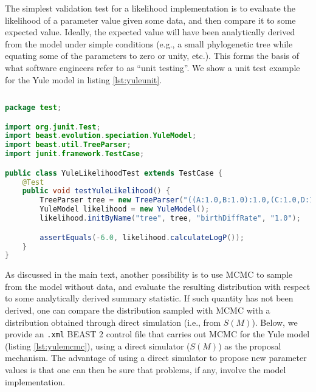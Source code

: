 \documentclass[oneside]{article}
\begin{document}
The simplest validation test for a likelihood implementation is to
evaluate the likelihood of a parameter value given some
data, and then compare it to some expected value.
Ideally, the expected value will have been analytically derived from the
model under simple conditions (e.g., a small phylogenetic tree while
equating some of the parameters to zero or unity, etc.).
This forms the basis of what software engineers refer to as ``unit testing''.
We show a unit test example for the Yule model in listing \ref{lst:yuleunit}.

{\small
\vspace{2cm}
\singlespacing
\begin{lstlisting}[language=Java, caption=Java unit test for Yule model
  likelihood function given a small phylogenetic tree.,label={lst:yuleunit}]
  
package test;

import org.junit.Test;
import beast.evolution.speciation.YuleModel;
import beast.util.TreeParser;
import junit.framework.TestCase;

public class YuleLikelihoodTest extends TestCase {
    @Test
    public void testYuleLikelihood() {
        TreeParser tree = new TreeParser("((A:1.0,B:1.0):1.0,(C:1.0,D:1.0):1.0);");
        YuleModel likelihood = new YuleModel();
        likelihood.initByName("tree", tree, "birthDiffRate", "1.0");

        assertEquals(-6.0, likelihood.calculateLogP());
    }
}
\end{lstlisting}
}

As discussed in the main text, another possibility is to use MCMC to
sample from the model without data, and evaluate the resulting
distribution with respect to some analytically derived summary
statistic.
If such quantity has not been derived, one can compare the
distribution sampled with MCMC with a distribution obtained through
direct simulation (i.e., from $S(M)$).
Below, we provide an \texttt{.xml} BEAST 2 control file that carries
out MCMC for the Yule model (listing
\ref{lst:yulemcmc}), using a direct simulator ($S(M)$) as the proposal
mechanism.
The advantage of using a direct simulator to propose new parameter values is
that one can then be sure that problems, if any, involve the model
implementation. 
\end{document}

